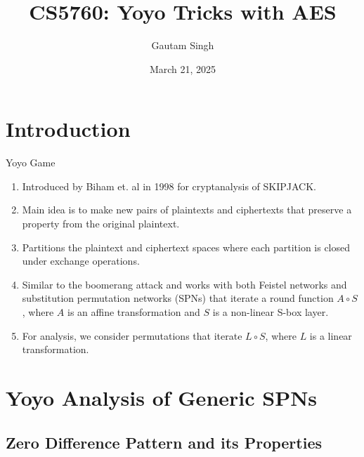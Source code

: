 \documentclass[notheorems]{beamer}
\title[Cryptanalysis of DES]{CS5760: Yoyo Tricks with AES}
\date{March 21, 2025}
\author{Gautam Singh}
\institute[IITH]{Indian Institute of Technology Hyderabad}
\theoremstyle{definition}
\theoremstyle{example}
\begin{document}
    
    \begin{frame}
        \titlepage
    \end{frame}
    
    \begin{frame}
        \tableofcontents
    \end{frame}
    
    \section{Introduction}
    \label{sec:intro}
    
    \begin{frame}{Yoyo Game}
        \begin{enumerate}
            \item<1-> Introduced by Biham et. al in 1998 for cryptanalysis of
            SKIPJACK. %
            \item<2-> Main idea is to make new pairs of plaintexts and
            ciphertexts that preserve a property from the original plaintext.
            \item<3-> Partitions the plaintext and ciphertext spaces where each
            partition is closed under exchange operations.
            \item<4-> Similar to the boomerang attack and works with both
            Feistel networks and substitution permutation networks (SPNs) that
            iterate a round function \(A \circ S\), where \(A\) is an affine
            transformation and \(S\) is a non-linear S-box layer.
            \item<5-> For analysis, we consider permutations that iterate \(L
            \circ S\), where \(L\) is a linear transformation.
        \end{enumerate}
    \end{frame}

    \section{Yoyo Analysis of Generic SPNs}
    \label{sec:yoyo-generic-analysis}

    \subsection{Zero Difference Pattern and its Properties}
    \label{subsec:zero-diff-pattern}
    
\end{document}
